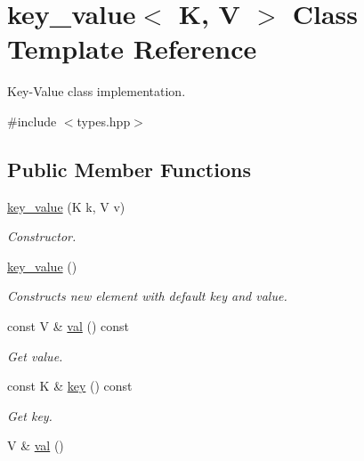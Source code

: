 \hypertarget{classkey__value}{}\section{key\+\_\+value$<$ K, V $>$ Class Template Reference}
\label{classkey__value}


Key-\/\+Value class implementation.  




{\ttfamily \#include $<$types.\+hpp$>$}

\subsection*{Public Member Functions}
\begin{DoxyCompactItemize}
\item 
\hyperlink{classkey__value_ad3a7caf2cf9eff66215ee4983c2f4bce}{key\+\_\+value} (K k, V v)
\begin{DoxyCompactList}\small\item\em Constructor. \end{DoxyCompactList}\item 
\hypertarget{classkey__value_a9209ff3cf223c216f87e2da1d12a39b2}{}\hyperlink{classkey__value_a9209ff3cf223c216f87e2da1d12a39b2}{key\+\_\+value} ()\label{classkey__value_a9209ff3cf223c216f87e2da1d12a39b2}

\begin{DoxyCompactList}\small\item\em Constructs new element with default key and value. \end{DoxyCompactList}\item 
\hypertarget{classkey__value_a1dec00eb7ce57a91bd991ecc4cef02b9}{}const V \& \hyperlink{classkey__value_a1dec00eb7ce57a91bd991ecc4cef02b9}{val} () const \label{classkey__value_a1dec00eb7ce57a91bd991ecc4cef02b9}

\begin{DoxyCompactList}\small\item\em Get value. \end{DoxyCompactList}\item 
\hypertarget{classkey__value_ae07d8b9f4f22b915c31e68785fa165a5}{}const K \& \hyperlink{classkey__value_ae07d8b9f4f22b915c31e68785fa165a5}{key} () const \label{classkey__value_ae07d8b9f4f22b915c31e68785fa165a5}

\begin{DoxyCompactList}\small\item\em Get key. \end{DoxyCompactList}\item 
\hypertarget{classkey__value_aef41e9f03857a8aefcf3b6464dd8d3ce}{}V \& \hyperlink{classkey__value_aef41e9f03857a8aefcf3b6464dd8d3ce}{val} ()\label{classkey__value_aef41e9f03857a8aefcf3b6464dd8d3ce}


\end{DoxyCompactItemize}
